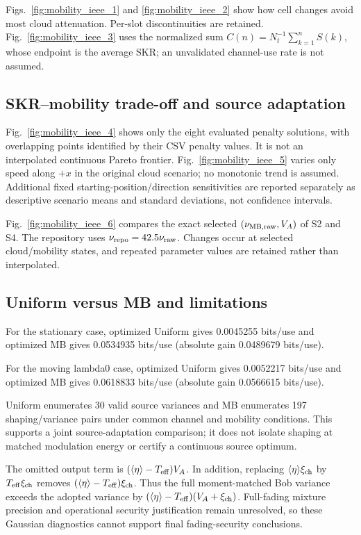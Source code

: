 Figs.~\ref{fig:mobility_ieee_1} and \ref{fig:mobility_ieee_2} show how cell changes avoid most cloud attenuation. Per-slot discontinuities are retained. Fig.~\ref{fig:mobility_ieee_3} uses the normalized sum $C(n)=N_t^{-1}\sum_{k=1}^n S(k)$, whose endpoint is the average SKR; an unvalidated channel-use rate is not assumed.

\subsection{SKR--mobility trade-off and source adaptation}

Fig.~\ref{fig:mobility_ieee_4} shows only the eight evaluated penalty solutions, with overlapping points identified by their CSV penalty values. It is not an interpolated continuous Pareto frontier. Fig.~\ref{fig:mobility_ieee_5} varies only speed along $+x$ in the original cloud scenario; no monotonic trend is assumed. Additional fixed starting-position/direction sensitivities are reported separately as descriptive scenario means and standard deviations, not confidence intervals.

Fig.~\ref{fig:mobility_ieee_6} compares the exact selected $(\nu_{\rm MB,raw},V_A)$ of S2 and S4. The repository uses $\nu_{\rm repo}=42.5\nu_{\rm raw}$. Changes occur at selected cloud/mobility states, and repeated parameter values are retained rather than interpolated.

\subsection{Uniform versus MB and limitations}

For the stationary case, optimized Uniform gives 0.0045255 bits/use and optimized MB gives 0.0534935 bits/use (absolute gain 0.0489679 bits/use).

For the moving lambda0 case, optimized Uniform gives 0.0052217 bits/use and optimized MB gives 0.0618833 bits/use (absolute gain 0.0566615 bits/use).

Uniform enumerates 30 valid source variances and MB enumerates 197 shaping/variance pairs under common channel and mobility conditions. This supports a joint source-adaptation comparison; it does not isolate shaping at matched modulation energy or certify a continuous source optimum.

The omitted output term is $(\langle\eta\rangle-T_{\rm eff})V_A$. In addition, replacing $\langle\eta\rangle\xi_{\rm ch}$ by $T_{\rm eff}\xi_{\rm ch}$ removes $(\langle\eta\rangle-T_{\rm eff})\xi_{\rm ch}$. Thus the full moment-matched Bob variance exceeds the adopted variance by $(\langle\eta\rangle-T_{\rm eff})(V_A+\xi_{\rm ch})$. Full-fading mixture precision and operational security justification remain unresolved, so these Gaussian diagnostics cannot support final fading-security conclusions.

